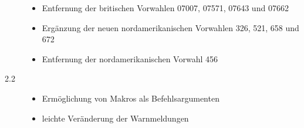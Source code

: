 \documentclass[numbers=noenddot]{scrreprt}
\begin{document}
\begin{description}
\begin{itemize}
\item Entfernung der britischen Vorwahlen 07007, 07571, 07643 und 07662
\item Ergänzung der neuen nordamerikanischen Vorwahlen 326, 521, 658 und 672
\item Entfernung der nordamerikanischen Vorwahl 456
\end{itemize}
\item[2.2] 
\begin{itemize}
\item Ermöglichung von Makros als Befehlsargumenten
\item leichte Veränderung der Warnmeldungen
\end{itemize}
\end{description}
\end{document}
